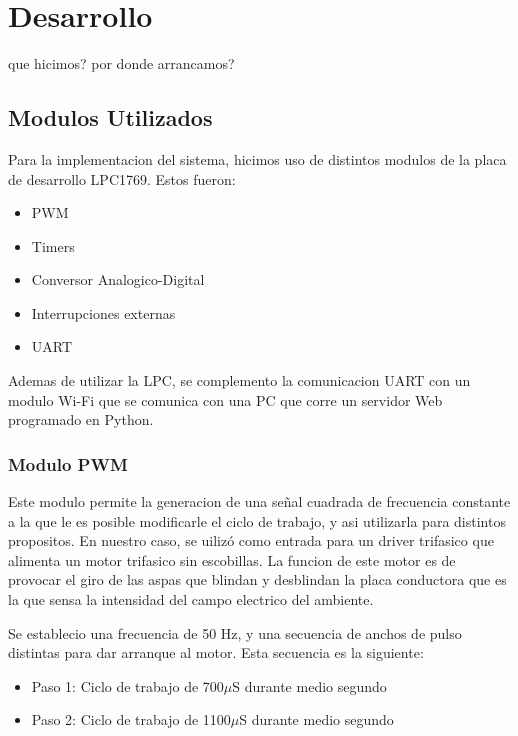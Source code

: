 \documentclass[a4paper]{article}
\begin{document}

\section{Desarrollo} %
\label{sec:desarrollo}

que hicimos? por donde arrancamos?


\subsection{Modulos Utilizados} %
\label{sub:modulos_utilizados}

Para la implementacion del sistema, hicimos uso de distintos modulos de la placa de desarrollo LPC1769. Estos fueron:

\begin{itemize}
 	\item PWM
 	\item Timers
 	\item Conversor Analogico-Digital
 	\item Interrupciones externas
 	\item UART
 \end{itemize} 

 Ademas de utilizar la LPC, se complemento la comunicacion UART con un modulo Wi-Fi que se comunica con una PC que corre un servidor Web programado en Python.

\subsubsection{Modulo PWM} %
\label{ssub:modulo_pwm}

Este modulo permite la generacion de una señal cuadrada de frecuencia constante a la que le es posible modificarle el ciclo de trabajo, y asi utilizarla para distintos propositos. En nuestro caso, se uilizó como entrada para un driver trifasico que alimenta un motor trifasico sin escobillas. La funcion de este motor es de provocar el giro de las aspas que blindan y desblindan la placa conductora que es la que sensa la intensidad del campo electrico del ambiente.

Se establecio una frecuencia de 50 Hz, y una secuencia de anchos de pulso distintas para dar arranque al motor. Esta secuencia es la siguiente:

\begin{itemize}
	\item Paso 1: Ciclo de trabajo de 700$\mu$S durante medio segundo
	\item Paso 2: Ciclo de trabajo de 1100$\mu$S durante medio segundo
\end{itemize}
\end{document}

